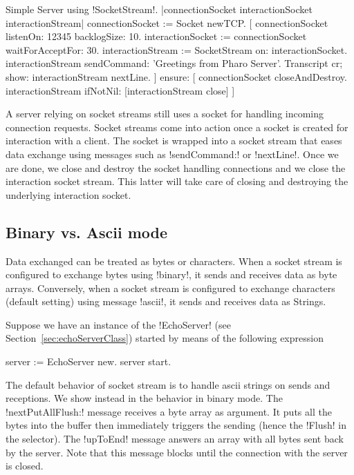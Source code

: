\documentclass[a4paper,10pt,twoside]{book}
\begin{document}
\begin{script}{Simple Server using \ct!SocketStream!.}
|connectionSocket interactionSocket interactionStream|
connectionSocket := Socket newTCP. 
[
	connectionSocket listenOn: 12345 backlogSize: 10. 
	interactionSocket := connectionSocket waitForAcceptFor: 30. 
	interactionStream := SocketStream on: interactionSocket.
	interactionStream sendCommand: 'Greetings from Pharo Server'.
	Transcript cr; show: interactionStream nextLine.
] ensure: [
	connectionSocket closeAndDestroy.
	interactionStream ifNotNil: [interactionStream close]
]
\end{script}

A server relying on socket streams still uses a socket for handling incoming connection requests.
Socket streams come into action once a socket is created for interaction with a client.
The socket is wrapped into a socket stream that eases data exchange using messages such as \ct!sendCommand:! or \ct!nextLine!.
Once we are done, we close and destroy the socket handling connections and we close the interaction socket stream.
This latter will take care of closing and destroying the underlying interaction socket.

\subsection{Binary vs. Ascii mode}
Data exchanged can be treated as bytes or characters. When a socket stream is configured to exchange bytes using \ct!binary!, it sends and receives data as byte arrays.
Conversely, when a socket stream is configured to exchange characters (default setting) using message \ct!ascii!, it sends and receives data as Strings.

Suppose we have an instance of the \ct!EchoServer! (see Section~\ref{sec:echoServerClass}) started by means of the following expression
\begin{code}{}
server := EchoServer new.
server start.
\end{code}

The default behavior of socket stream is to handle ascii strings on sends and receptions.
We show instead in  the behavior in binary mode.
The \ct!nextPutAllFlush:! message receives a byte array as argument.
It puts all the bytes into the buffer then immediately triggers the sending (hence the \ct!Flush! in the selector).
The \ct!upToEnd! message answers an array with all bytes sent back by the server.
Note that this message blocks until the connection with the server is closed.
\end{document}
